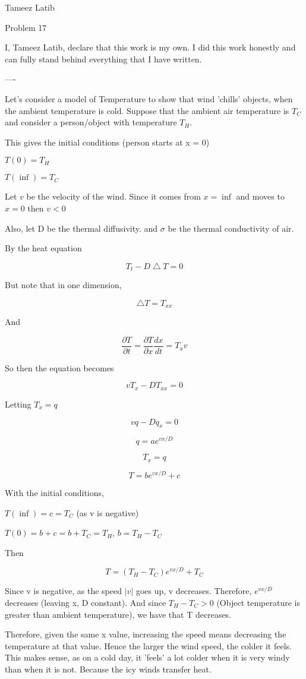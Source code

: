 \documentclass{article}
\begin{document}
Tameez Latib

Problem 17

I, Tameez Latib, declare that this work is my own. I did this work honestly and can fully stand behind everything that I have written.

----

Let's consider a model of Temperature to show that wind 'chills' objects, when the ambient temperature is cold. 
Suppose that the ambient air temperature is $T_C$ and consider a person/object with temperature $T_H$. 

This gives the initial conditions (person starts at x = 0)

$T(0) = T_H$

$T(\inf) = T_C$

Let $v$ be the velocity of the wind. Since it comes from $x = \inf$ and moves to $x = 0$ then $v < 0$

Also, let D be the thermal diffusivity. and $\sigma$ be the thermal conductivity of air. 

By the heat equation

$$T_t - D\bigtriangleup T = 0$$


But note that in one dimension,

$$\bigtriangleup T = T_{xx} $$

And

$$ \frac{\partial T}{\partial t} =   \frac{\partial T}{\partial x}  \frac{dx}{dt} =  T_xv$$  

So then the equation becomes

$$vT_x - DT_{xx} = 0$$

Letting $T_x = q$

$$vq - Dq_x = 0$$

$$q = ae^{vx/D}$$

$$T_x = q$$

$$T = be^{vx/D} + c$$

With the initial conditions, 

$T(\inf) = c = T_C$ (as v is negative)

$T(0) = b + c = b + T_C =  T_H$, $b = T_H - T_C$

Then 

$$T = (T_H-T_C)e^{vx/D} + T_C$$

Since v is negative, as the speed $|v|$ goes up, v decreases. Therefore, $e^{vx/D}$ decreases (leaving x, D constant). And since $T_H - T_C > 0$  (Object temperature is greater than ambient temperature), we have that T decreases. 

Therefore, given the same x value, increasing the speed means decreasing the temperature at that value. Hence the larger the wind speed, the colder it feels. This makes sense, as on a cold day, it 'feels' a lot colder when it is very windy than when it is not. Because the icy winds transfer heat.
\end{document}

